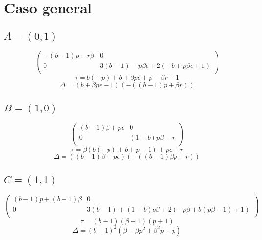 \documentclass[11pt]{article}
\begin{document}
\newpage

\section*{Caso general}

\subsection*{$A=(0,1)$}
\begin{equation}
\left(
\begin{array}{cc}
 -(b-1) p-r \beta  & 0 \\
 0 & 3 (b-1)-p \beta  \epsilon +2 (-b+p \beta  \epsilon +1) \\
\end{array}
\right)
\end{equation}
\begin{equation}
\tau=b (-p)+b+\beta  p \epsilon +p-\beta  r-1
\end{equation}
\begin{equation}
\Delta=(b+\beta  p \epsilon -1) (-((b-1) p+\beta  r))
\end{equation}

\subsection*{$B=(1,0)$}
\begin{equation}
\left(
\begin{array}{cc}
 (b-1) \beta +p \epsilon  & 0 \\
 0 & (1-b) p \beta -r \\
\end{array}
\right)
\end{equation}
\begin{equation}
\tau=\beta  (b (-p)+b+p-1)+p \epsilon -r
\end{equation}
\begin{equation}
\Delta=((b-1) \beta +p \epsilon ) (-((b-1) \beta  p+r))
\end{equation}


\subsection*{$C=(1,1)$}
\begin{equation}
\left(
\begin{array}{cc}
 (b-1) p+(b-1) \beta  & 0 \\
 0 & 3 (b-1)+(1-b) p \beta +2 (-p \beta +b (p \beta -1)+1) \\
\end{array}
\right)
\end{equation}
\begin{equation}
\tau=(b-1) (\beta +1) (p+1)
\end{equation}
\begin{equation}
\Delta=(b-1)^2 \left(\beta +\beta  p^2+\beta ^2 p+p\right)
\end{equation}
\end{document}
